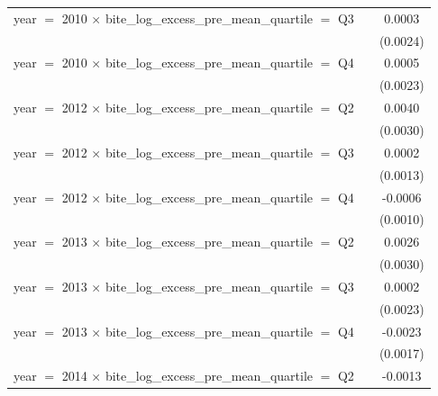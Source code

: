 \begin{tabular}{lcc}
   year $=$ 2010 $\times$ bite\_log\_excess\_pre\_mean\_quartile $=$ Q3       &                          & 0.0003\\   
                                                                              &                          & (0.0024)\\   
   year $=$ 2010 $\times$ bite\_log\_excess\_pre\_mean\_quartile $=$ Q4       &                          & 0.0005\\   
                                                                              &                          & (0.0023)\\   
   year $=$ 2012 $\times$ bite\_log\_excess\_pre\_mean\_quartile $=$ Q2       &                          & 0.0040\\   
                                                                              &                          & (0.0030)\\   
   year $=$ 2012 $\times$ bite\_log\_excess\_pre\_mean\_quartile $=$ Q3       &                          & 0.0002\\   
                                                                              &                          & (0.0013)\\   
   year $=$ 2012 $\times$ bite\_log\_excess\_pre\_mean\_quartile $=$ Q4       &                          & -0.0006\\   
                                                                              &                          & (0.0010)\\   
   year $=$ 2013 $\times$ bite\_log\_excess\_pre\_mean\_quartile $=$ Q2       &                          & 0.0026\\   
                                                                              &                          & (0.0030)\\   
   year $=$ 2013 $\times$ bite\_log\_excess\_pre\_mean\_quartile $=$ Q3       &                          & 0.0002\\   
                                                                              &                          & (0.0023)\\   
   year $=$ 2013 $\times$ bite\_log\_excess\_pre\_mean\_quartile $=$ Q4       &                          & -0.0023\\   
                                                                              &                          & (0.0017)\\   
   year $=$ 2014 $\times$ bite\_log\_excess\_pre\_mean\_quartile $=$ Q2       &                          & -0.0013\\   

\end{tabular}
